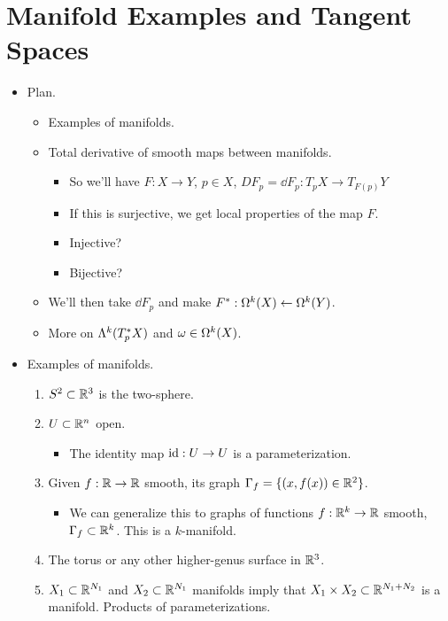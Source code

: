 \documentclass[../notes.tex]{subfiles}
\begin{document}
\section{Manifold Examples and Tangent Spaces}
\begin{itemize}
    \item {}Plan.
    \begin{itemize}
        \item Examples of manifolds.
        \item Total derivative of smooth maps between manifolds.
        \begin{itemize}
            \item So we'll have $F:X\to Y$, $p\in X$, $DF_p=\dd{F_p}:T_pX\to T_{F(p)}Y$
            \item If this is surjective, we get local properties of the map $F$.
            \item Injective?
            \item Bijective?
        \end{itemize}
        \item We'll then take $\dd{F_p}$ and make $F^*:\ome[k]{X}\leftarrow\ome[k]{Y}$.
        \item More on $\lam[k]{T_p^*X}$ and $\omega\in\ome[k]{X}$.
    \end{itemize}
    \item Examples of manifolds.
    \begin{enumerate}
        \item $S^2\subset\R^3$ is the two-sphere.
        \item $U\subset\R^n$ open.
        \begin{itemize}
            \item The identity map $\id:U\to U$ is a parameterization.
        \end{itemize}
        \item Given $f:\R\to\R$ smooth, its graph $\Gamma_f=\{(x,f(x))\in\R^2\}$.
        \begin{itemize}
            \item We can generalize this to graphs of functions $f:\R^k\to\R$ smooth, $\Gamma_f\subset\R^k$. This is a $k$-manifold.
        \end{itemize}
        \item The torus or any other higher-genus surface in $\R^3$.
        \item $X_1\subset\R^{N_1}$ and $X_2\subset\R^{N_1}$ manifolds imply that $X_1\times X_2\subset\R^{N_1+N_2}$ is a manifold. Products of parameterizations.

\end{enumerate}
\end{itemize}
\end{document}
